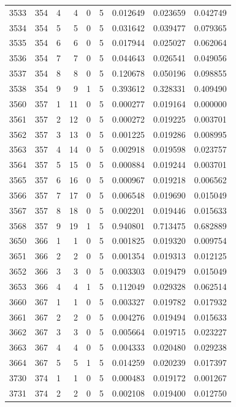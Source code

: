 \begin{longtable}{rrrrrrrrr}
3533 & 354 & 4 & 4 & 0 & 5 & 0.012649 & 0.023659 & 0.042749 \\
3534 & 354 & 5 & 5 & 0 & 5 & 0.031642 & 0.039477 & 0.079365 \\
3535 & 354 & 6 & 6 & 0 & 5 & 0.017944 & 0.025027 & 0.062064 \\
3536 & 354 & 7 & 7 & 0 & 5 & 0.044643 & 0.026541 & 0.049056 \\
3537 & 354 & 8 & 8 & 0 & 5 & 0.120678 & 0.050196 & 0.098855 \\
3538 & 354 & 9 & 9 & 1 & 5 & 0.393612 & 0.328331 & 0.409490 \\
3560 & 357 & 1 & 11 & 0 & 5 & 0.000277 & 0.019164 & 0.000000 \\
3561 & 357 & 2 & 12 & 0 & 5 & 0.000272 & 0.019225 & 0.003701 \\
3562 & 357 & 3 & 13 & 0 & 5 & 0.001225 & 0.019286 & 0.008995 \\
3563 & 357 & 4 & 14 & 0 & 5 & 0.002918 & 0.019598 & 0.023757 \\
3564 & 357 & 5 & 15 & 0 & 5 & 0.000884 & 0.019244 & 0.003701 \\
3565 & 357 & 6 & 16 & 0 & 5 & 0.000967 & 0.019218 & 0.006562 \\
3566 & 357 & 7 & 17 & 0 & 5 & 0.006548 & 0.019690 & 0.015049 \\
3567 & 357 & 8 & 18 & 0 & 5 & 0.002201 & 0.019446 & 0.015633 \\
3568 & 357 & 9 & 19 & 1 & 5 & 0.940801 & 0.713475 & 0.682889 \\
3650 & 366 & 1 & 1 & 0 & 5 & 0.001825 & 0.019320 & 0.009754 \\
3651 & 366 & 2 & 2 & 0 & 5 & 0.001354 & 0.019313 & 0.012125 \\
3652 & 366 & 3 & 3 & 0 & 5 & 0.003303 & 0.019479 & 0.015049 \\
3653 & 366 & 4 & 4 & 1 & 5 & 0.112049 & 0.029328 & 0.062514 \\
3660 & 367 & 1 & 1 & 0 & 5 & 0.003327 & 0.019782 & 0.017932 \\
3661 & 367 & 2 & 2 & 0 & 5 & 0.004276 & 0.019494 & 0.015633 \\
3662 & 367 & 3 & 3 & 0 & 5 & 0.005664 & 0.019715 & 0.023227 \\
3663 & 367 & 4 & 4 & 0 & 5 & 0.004333 & 0.020480 & 0.029238 \\
3664 & 367 & 5 & 5 & 1 & 5 & 0.014259 & 0.020239 & 0.017397 \\
3730 & 374 & 1 & 1 & 0 & 5 & 0.000483 & 0.019172 & 0.001267 \\
3731 & 374 & 2 & 2 & 0 & 5 & 0.002108 & 0.019400 & 0.012750 \\

\end{longtable}
